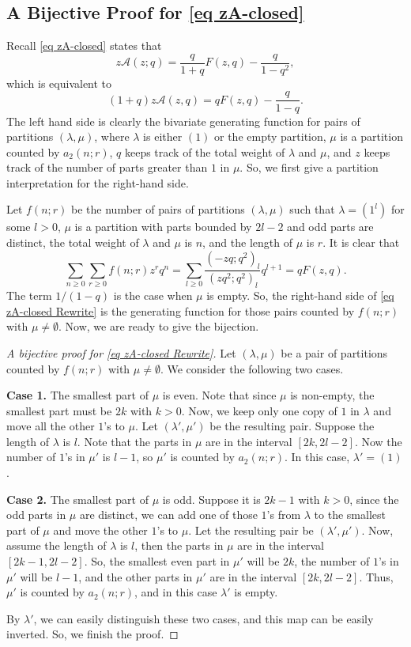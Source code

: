 \documentclass[reqno]{amsart}
\theoremstyle{definition}
\theoremstyle{plain}
\theoremstyle{remark}
\numberwithin{equation}{section}
\begin{document}
\subsection{A Bijective Proof for \eqref{eq zA-closed}} Recall \eqref{eq zA-closed} states that
\begin{equation*}
z\mathcal{A}(z;q)=\frac{q}{1+q}F(z,q)-\frac{q}{1-q^2},
\end{equation*}
which is equivalent to
\begin{equation}\label{eq zA-closed Rewrite}
(1+q)z\mathcal{A}(z,q)=qF(z,q)-\frac{q}{1-q}.
\end{equation}
The left hand side is clearly the bivariate generating function for pairs of partitions $(\lambda,\mu)$, where $\lambda$ is either $(1)$ or the empty partition, $\mu$ is a partition counted by $a_2(n;r)$, $q$ keeps track of the total weight of $\lambda$ and $\mu$, and $z$ keeps track of the number of parts greater than $1$ in $\mu$. So, we first give a partition interpretation for the right-hand side.

Let $f(n;r)$ be the number of pairs of partitions $(\lambda,\mu)$ such that $\lambda=(1^{l})$ for some $l>0$, $\mu$ is a partition with parts bounded by $2l-2$ and odd parts are distinct, the total weight of $\lambda$ and $\mu$ is $n$, and the length of $\mu$ is $r$. It is clear that
$$\sum_{n\geq0}\sum_{r\geq0}f(n;r)z^rq^n=\sum_{l\geq0}\frac{(-zq;q^2)_l}{(zq^2;q^2)_l}q^{l+1}=qF(z,q).$$
The term $1/(1-q)$ is the case when $\mu$ is empty. So, the right-hand side of \eqref{eq zA-closed Rewrite} is the generating function for those pairs counted by $f(n;r)$ with $\mu\neq\emptyset$. Now, we are ready to give the bijection.
\begin{proof}[A bijective proof for \eqref{eq zA-closed Rewrite}] Let $(\lambda,\mu)$ be a pair of partitions counted by $f(n;r)$ with $\mu\neq\emptyset$. We consider the following two cases.

\textbf{Case 1.} The smallest part of $\mu$ is even. Note that since $\mu$ is non-empty, the smallest part must be $2k$ with $k>0$. Now, we keep only one copy of $1$ in $\lambda$ and move all the other $1$'s to $\mu$. Let $(\lambda',\mu')$ be the resulting pair. Suppose the length of $\lambda$ is $l$. Note that the parts in $\mu$ are in the interval $[2k,2l-2]$. Now the number of $1$'s in $\mu'$ is $l-1$, so $\mu'$ is counted by $a_2(n;r)$. In this case, $\lambda'=(1)$.

\textbf{Case 2.} The smallest part of $\mu$ is odd. Suppose it is $2k-1$ with $k>0$, since the odd parts in $\mu$ are distinct, we can add one of those $1$'s from $\lambda$ to the smallest part of $\mu$ and move the other $1$'s to $\mu$. Let the resulting pair be $(\lambda',\mu')$. Now, assume the length of $\lambda$ is $l$, then the parts in $\mu$ are in the interval $[2k-1,2l-2]$. So, the smallest even part in $\mu'$ will be $2k$, the number of $1$'s in $\mu'$ will be $l-1$, and the other parts in $\mu'$ are in the interval $[2k,2l-2]$. Thus, $\mu'$ is counted by $a_2(n;r)$, and in this case $\lambda'$ is empty.

By $\lambda'$, we can easily distinguish these two cases, and this map can be easily inverted. So, we finish the proof.
\end{proof}
\end{document}
